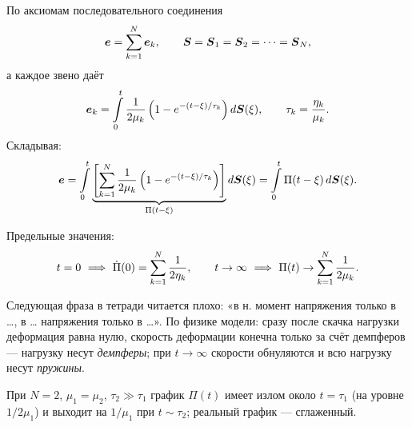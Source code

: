 По аксиомам последовательного соединения
\[
  \boldsymbol{e} = \sum_{k=1}^{N} \boldsymbol{e}_k ,
  \qquad
  \boldsymbol{S} = \boldsymbol{S}_1 = \boldsymbol{S}_2 = \dots = \boldsymbol{S}_N ,
\]
а каждое звено даёт
\[
  \boldsymbol{e}_k = \int\limits_0^t \frac{1}{2\mu_k}\left(1 - e^{-(t-\xi)/\tau_k}\right) d\boldsymbol{S}(\xi) ,
  \qquad
  \tau_k = \frac{\eta_k}{\mu_k} .
\]
Складывая:
\[
  \boldsymbol{e} = \int\limits_0^t \underbrace{\left[\sum_{k=1}^{N}\frac{1}{2\mu_k}
         \left(1 - e^{-(t-\xi)/\tau_k}\right)\right]}_{\Pi(t-\xi)} d\boldsymbol{S}(\xi)
       = \int\limits_0^t \Pi(t-\xi)\,d\boldsymbol{S}(\xi) .
\]

Предельные значения:
\[
  t = 0 \ \Longrightarrow\ \dt\Pi(0) = \sum_{k=1}^{N}\frac{1}{2\eta_k} ,
  \qquad
  t \to \infty \ \Longrightarrow\ \Pi(t) \to \sum_{k=1}^{N}\frac{1}{2\mu_k} .
\]

\begin{warn}
Следующая фраза в тетради читается плохо: «в н. момент напряжения только
в \dots, в \dots{} напряжения только в \dots». По физике модели: сразу после
скачка нагрузки деформация равна нулю, скорость деформации конечна только за счёт
демпферов — нагрузку несут \emph{демпферы}; при $t\to\infty$ скорости обнуляются
и всю нагрузку несут \emph{пружины}.
\end{warn}

При $N = 2$, $\mu_1 = \mu_2$, $\tau_2 \gg \tau_1$ график $\Pi(t)$ имеет излом
около $t = \tau_1$ (на уровне $1/2\mu_1$) и выходит на $1/\mu_1$ при $t\sim\tau_2$;
реальный график — сглаженный.

